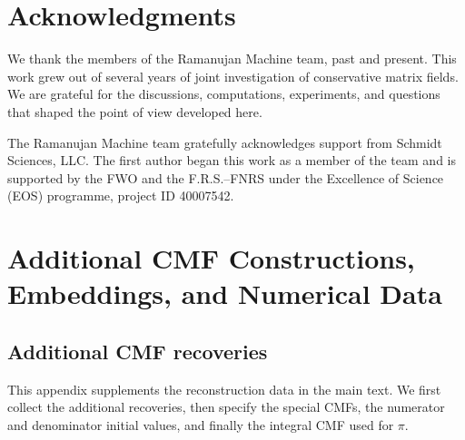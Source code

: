 \documentclass[oneside,english,11pt]{amsart}
\begin{document}

\section*{Acknowledgments}

We thank the members of the Ramanujan Machine team, past and present.
This work grew out of several years of joint investigation of
conservative matrix fields.  We are grateful for the discussions,
computations, experiments, and questions that shaped the point of view
developed here.

The Ramanujan Machine team gratefully acknowledges support from
Schmidt Sciences, LLC.  The first author began this work as a member
of the team and is supported by the FWO and the F.R.S.--FNRS under
the Excellence of Science (EOS) programme, project ID 40007542.



\printbibliography

\newpage
\appendix


\section{Additional CMF Constructions, Embeddings, and Numerical Data}
\label{sec:appendix-history}

\subsection{Additional CMF recoveries}
\label{app:full-results}
This appendix supplements the reconstruction data in the main text.
We first collect the additional recoveries,
then specify the special CMFs, the numerator and denominator initial values, and finally the integral CMF used for $\pi$.
\end{document}
